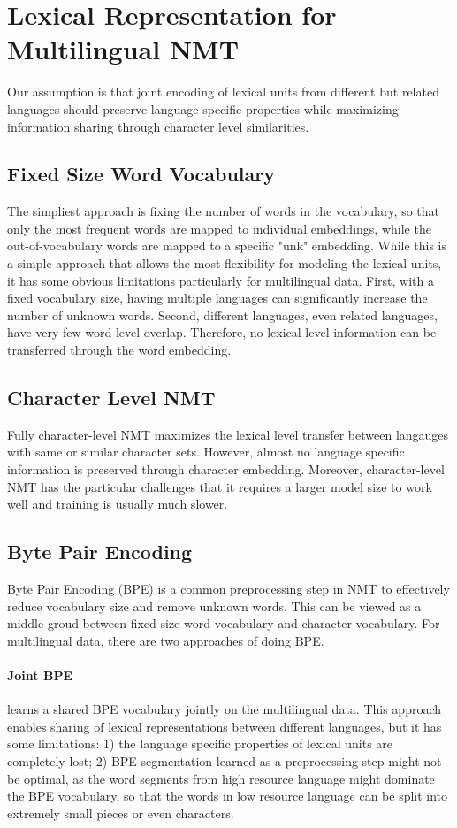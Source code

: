 \section{\label{sec:vocab_reduction}Lexical Representation for Multilingual NMT}
Our assumption is that joint encoding of lexical units from different but related languages should preserve language specific properties while maximizing information sharing through character level similarities.
\subsection{Fixed Size Word Vocabulary}
The simpliest approach is fixing the number of words in the vocabulary, so that only the most frequent words are mapped to individual embeddings, while the out-of-vocabulary words are mapped to a specific "unk" embedding. While this is a simple approach that allows the most flexibility for modeling the lexical units, it has some obvious limitations particularly for multilingual data. First, with a fixed vocabulary size, having multiple languages can significantly increase the number of unknown words. Second, different languages, even related languages, have very few word-level overlap. Therefore, no lexical level information can be transferred through the word embedding. 

\subsection{Character Level NMT}
Fully character-level NMT maximizes the lexical level transfer between langauges with same or similar character sets. However, almost no language specific information is preserved through character embedding. Moreover, character-level NMT has the particular challenges that it requires a larger model size to work well and training is usually much slower.

\subsection{Byte Pair Encoding}
Byte Pair Encoding (BPE) is a common preprocessing step in NMT to effectively reduce vocabulary size and remove unknown words. This can be viewed as a middle groud between fixed size word vocabulary and character vocabulary. For multilingual data, there are two approaches of doing BPE. 
\paragraph{Joint BPE} learns a shared BPE vocabulary jointly on the multilingual data. This approach enables sharing of lexical representations between different languages, but it has some limitations: 1) the language specific properties of lexical units are completely lost; 2) BPE segmentation learned as a preprocessing step might not be optimal, as the word segments from high resource language might dominate the BPE vocabulary, so that the words in low resource language can be split into extremely small pieces or even characters. 
